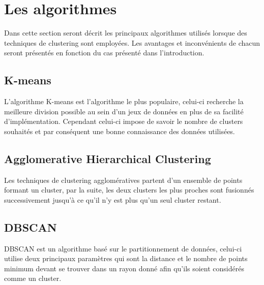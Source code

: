 \documentclass[memoire.tex]{subfiles}
\begin{document}
\newpage
\section{Les algorithmes}
Dans cette section seront décrit les principaux algorithmes utilisés lorsque des techniques de clustering sont employées. Les avantages et inconvénients de chacun seront présentés en fonction du cas présenté dans l'introduction.
\subsection{K-means}

L'algorithme K-means est l'algorithme le plus populaire, celui-ci recherche la meilleure division possible au sein d'un jeux de données \cite{ref5} en plus de sa facilité d'implémentation. Cependant celui-ci impose de savoir le nombre de clusters souhaités et par conséquent une bonne connaissance des données utilisées.

\subsection{Agglomerative Hierarchical Clustering}

Les techniques de clustering agglomératives partent d'un ensemble de points formant un cluster, par la suite, les deux clusters les plus proches sont fusionnés successivement jusqu'à ce qu'il n'y est plus qu'un seul cluster restant. \cite{ref4}

\subsection{DBSCAN}

DBSCAN est un algorithme basé sur le partitionnement de données, celui-ci utilise deux principaux paramètres qui sont la distance et le nombre de points minimum devant se trouver dans un rayon donné afin qu'ils soient considérés comme un cluster.
\end{document}
